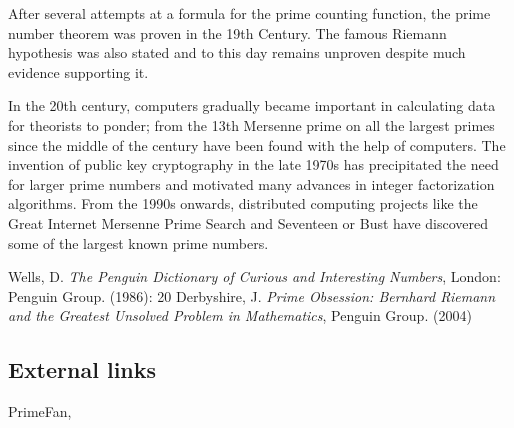 \documentclass[12pt]{article}
\begin{document}
After several attempts at a formula for the prime counting function, the prime number theorem was proven in the 19th Century. The famous Riemann hypothesis was also stated and to this day remains unproven despite much evidence supporting it.


In the 20th century, computers gradually became important in calculating data for theorists to ponder; from the 13th Mersenne prime on all the largest primes since the middle of the century have been found with the help of computers. The invention of public key cryptography in the late 1970s has precipitated the need for larger prime numbers and motivated many advances in integer factorization algorithms. From the 1990s onwards, distributed computing projects like the Great Internet Mersenne Prime Search and Seventeen or Bust have discovered some of the largest known prime numbers.

\begin{thebibliography}{1}
 Wells, D. {\it The Penguin Dictionary of Curious and Interesting Numbers}, London: Penguin Group. (1986): 20
 Derbyshire, J. {\it Prime Obsession: Bernhard Riemann and the Greatest Unsolved Problem in Mathematics}, Penguin Group. (2004)
\end{thebibliography}

\subsection{External links}
PrimeFan, 
\end{document}
